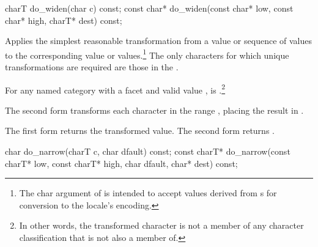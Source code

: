%
\begin{itemdecl}
charT        do_widen(char c) const;
const char*  do_widen(const char* low, const char* high, charT* dest) const;
\end{itemdecl}

\begin{itemdescr}
\pnum
\effects
Applies the simplest reasonable transformation from a
value or sequence of
values to the corresponding
value or values.\footnote{The char argument of
is intended to accept values derived from s for conversion
to the locale's encoding.}
The only characters for which unique transformations are required
are those in the .

For any named
category with a
facet  and valid
value ,
is
.\footnote{In other words, the transformed character is not a member
of any character classification that  is not also a member of.}

The second form transforms each character
in the range
,
placing the result in
.

\pnum
\returns
The first form returns the transformed value.
The second form returns .
\end{itemdescr}

%
\begin{itemdecl}
char         do_narrow(charT c, char dfault) const;
const charT* do_narrow(const charT* low, const charT* high, char dfault, char* dest) const;
\end{itemdecl}

